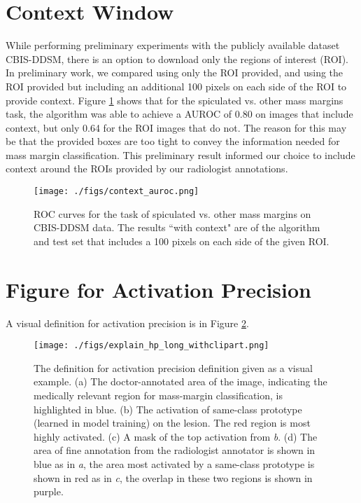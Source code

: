 \documentclass[11pt]{article}
\begin{document}
\section{Context Window} \label{app:context}
\FloatBarrier
While performing preliminary experiments with the publicly available dataset CBIS-DDSM, there is an option to download only the regions of interest (ROI). In preliminary work, we compared using only the ROI provided, and using the ROI provided but including an additional 100 pixels on each side of the ROI to provide context. Figure \ref{fig:context} shows that for the spiculated vs$.$ other mass margins task, the algorithm was able to achieve a AUROC of 0.80 on images that include context, but only 0.64 for the ROI images that do not. The reason for this may be that the provided boxes are too tight to convey the information needed for mass margin classification. This preliminary result informed our choice to include context around the ROIs provided by our radiologist annotations.

\begin{figure}[h]
        \begin{center}
            \texttt{[image: ./figs/context\_auroc.png]}
          \vspace*{-20pt}
        \end{center}
        \vfill
          \caption{ROC curves for the task of spiculated vs$.$ other mass margins on CBIS-DDSM data. The results ``with context" are of the algorithm and test set that includes a 100 pixels on each side of the given ROI.}
        \label{fig:context}
\end{figure}
\FloatBarrier
\section{Figure for Activation Precision} \label{app:activation_precision}
\FloatBarrier
A visual definition for activation precision is in Figure \ref{fig:ap_def}.

\begin{figure}[h]
        \begin{center}
            \texttt{[image: ./figs/explain\_hp\_long\_withclipart.png]}
          \vspace*{-20pt}
        \end{center}
        \vfill
          \caption{The definition for activation precision definition given as a visual example. (a) The doctor-annotated area of the image, indicating the medically relevant region for mass-margin classification, is highlighted in blue. (b) The activation of same-class prototype (learned in model training) on the lesion. The red region is most highly activated. (c) A mask of the top activation from \textit{b}. (d) The area of fine annotation from the radiologist annotator is shown in blue as in \textit{a}, the area most activated by a same-class prototype is shown in red as in \textit{c}, the overlap in these two regions is shown in purple.}
        \label{fig:ap_def}
\end{figure}
\FloatBarrier
\end{document}
